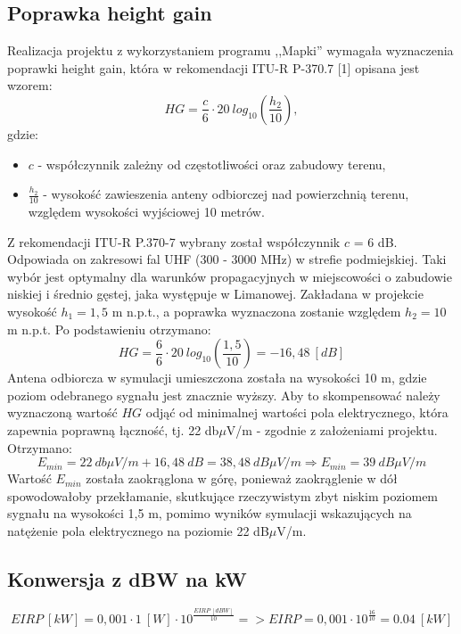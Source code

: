 \documentclass[12pt, a4paper, oneside]{article}
\begin{document}
\subsection{Poprawka height gain}
\indent\indent Realizacja projektu z wykorzystaniem programu ,,Mapki'' wymagała wyznaczenia poprawki height gain, która w rekomendacji ITU-R P-370.7 [1] opisana jest wzorem:
\begin{equation}
HG = \frac{c}{6}\cdot20~ log_{10}(\frac{h_2}{10}),
\end{equation}
gdzie:
\begin{itemize}
\item $c$ - współczynnik zależny od częstotliwości oraz zabudowy terenu,
\item $\frac{h_2}{10}$ - wysokość zawieszenia anteny odbiorczej nad powierzchnią terenu, względem wysokości wyjściowej 10 metrów.
\end{itemize}
\indent\indent Z rekomendacji ITU-R P.370-7 wybrany został współczynnik $c$ = 6 dB. Odpowiada on zakresowi fal UHF (300 - 3000 MHz) w strefie podmiejskiej. Taki wybór jest optymalny dla warunków propagacyjnych w miejscowości o zabudowie niskiej i średnio gęstej, jaka występuje w Limanowej. Zakładana w projekcie wysokość $h_1 = 1,5$ m n.p.t., a poprawka wyznaczona zostanie względem $h_2 = 10$ m n.p.t. Po podstawieniu otrzymano:
\begin{equation}
HG=\frac{6}{6}\cdot 20~log_{10}(\frac{1,5}{10})=-16,48~[dB]
\end{equation}
\indent\indent Antena odbiorcza w symulacji umieszczona została na wysokości 10 m, gdzie poziom odebranego sygnału jest znacznie wyższy. Aby to skompensować należy wyznaczoną wartość $HG$ odjąć od minimalnej wartości pola elektrycznego, która zapewnia poprawną łączność, tj. 22 db$\mu$V/m - zgodnie z założeniami projektu. Otrzymano:
\begin{equation}
E_{min} = 22~db\mu V/m + 16,48~dB = 38,48~dB\mu V/m\Rightarrow E_{min}=39~dB\mu V/m
\end{equation}
\indent Wartość $E_{min}$ została zaokrąglona w górę, ponieważ zaokrąglenie w dół spowodowałoby przekłamanie, skutkujące rzeczywistym zbyt niskim poziomem sygnału na wysokości 1,5 m, pomimo wyników symulacji wskazujących na natężenie pola elektrycznego na poziomie 22 dB$\mu$V/m.
\subsection{Konwersja z dBW na kW}
\begin{equation}
EIRP~[kW]=0,001\cdot1~[W]\cdot10^{\frac{EIRP~[dBW]}{10}} => EIRP = 0,001\cdot10^{\frac{16}{10}}=0.04~[kW]
\end{equation}
\end{document}
